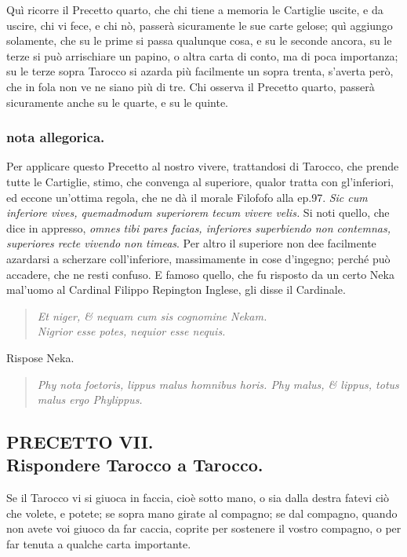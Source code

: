 \documentclass[11pt,a6paper]{article}
\newcommand{\literaryquote}[1]{%
\kern -6pt  \begin{verse}
    {\footnotesize \it #1}
  \end{verse}\kern -2pt%
}
\begin{document}
Quì ricorre il Precetto quarto, che chi
tiene a memoria le Cartiglie uscite,
e da uscire, chi vi fece, e chi nò,
passerà sicuramente le sue carte gelose; quì
aggiungo solamente, che su le prime si passa
qualunque cosa, e su le seconde ancora, su
le terze si può arrischiare un papino, o altra
carta di conto, ma di poca importanza; su le
terze sopra Tarocco si azarda più facilmente
un sopra trenta, s'averta però, che in fola
non ve ne siano più di tre. Chi osserva il
Precetto quarto, passerà sicuramente anche su le
quarte, e su le quinte.

\subsubsection{nota allegorica.}
{\footnotesize
Per applicare questo Precetto al nostro vivere,
trattandosi di Tarocco, che prende tutte le Cartiglie,
stimo, che convenga al superiore, qualor tratta
con gl'inferiori, ed eccone un'ottima regola,
che ne dà il morale Filofofo alla ep.97. \textit{
  Sic cum inferiore vives, quemadmodum superiorem
  tecum vivere velis.} Si noti quello, che dice
in appresso, \textit{
omnes tibi pares facias, inferiores superbiendo non
contemnas, superiores recte vivendo non timeas}.
Per altro il superiore non dee facilmente azardarsi
a scherzare coll'inferiore, massimamente in cose
d'ingegno; perché può accadere, che ne resti
confuso. E famoso quello, che fu risposto da un certo
Neka mal'uomo al Cardinal Filippo Repington
Inglese, gli disse il Cardinale.

\literaryquote{
 Et niger, \& nequam cum sis cognomine Nekam.\\
 Nigrior esse potes, nequior esse nequis.}

Rispose Neka.

\literaryquote{Phy nota foetoris, lippus malus homnibus horis.
Phy malus, \& lippus, totus malus ergo Phylippus.}
}
\subsection{PRECETTO VII.\\
 \footnotesize Rispondere Tarocco a Tarocco.}

Se il Tarocco vi si giuoca in faccia, cioè
sotto mano, o sia dalla destra fatevi ciò
che volete, e potete; se sopra mano girate al
compagno; se dal compagno, quando non
avete voi giuoco da far caccia, coprite per
sostenere il vostro compagno, o per far tenuta
a qualche carta importante.
\end{document}
